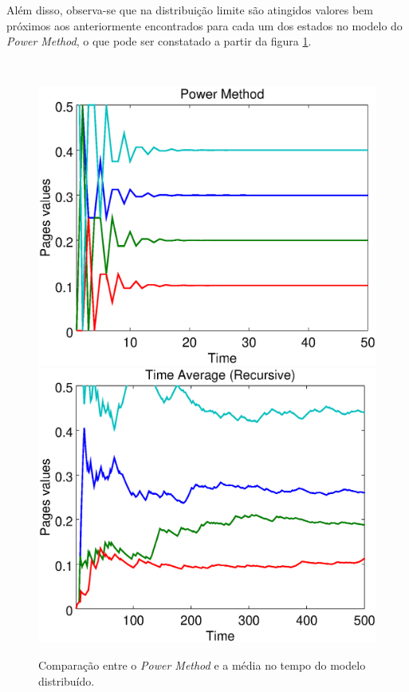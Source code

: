 \documentclass[a4paper]{report} %
\begin{document}
Além disso, observa-se que na distribuição limite são atingidos valores bem próximos aos anteriormente encontrados para cada um dos estados no modelo do \textit{Power Method}, o que pode ser constatado a partir da figura \ref{powertime}.

\
\begin{figure}[!htb]
	\centering
	\includegraphics[scale=0.3]{imagens/powermethod}
	\hspace{0.1cm}
	\includegraphics[scale=0.3]{imagens/timerecursive}
	\caption{Comparação entre o \textit{Power Method} e a média no tempo do modelo distribuído.}
	\label{powertime}
\end{figure}
\end{document}
